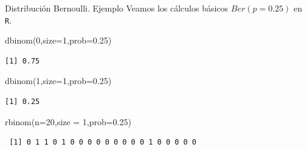 \documentclass[
  ignorenonframetext,
  aspectratio=169]{beamer}
\newenvironment{Shaded}{\begin{snugshade}}{\end{snugshade}}
\newcommand{\AttributeTok}[1]{\textcolor[rgb]{0.40,0.45,0.13}{#1}}
\newcommand{\DecValTok}[1]{\textcolor[rgb]{0.68,0.00,0.00}{#1}}
\newcommand{\FloatTok}[1]{\textcolor[rgb]{0.68,0.00,0.00}{#1}}
\newcommand{\FunctionTok}[1]{\textcolor[rgb]{0.28,0.35,0.67}{#1}}
\newcommand{\NormalTok}[1]{\textcolor[rgb]{0.00,0.23,0.31}{#1}}
\begin{document}
\begin{frame}[fragile]{Distribución Bernoulli. Ejemplo}
\protect\hypertarget{distribuciuxf3n-bernoulli.-ejemplo}{}
Veamos los cálculos básicos \(Ber(p=0.25)\) en \texttt{R}.

\begin{Shaded}
\begin{Highlighting}[]
\FunctionTok{dbinom}\NormalTok{(}\DecValTok{0}\NormalTok{,}\AttributeTok{size=}\DecValTok{1}\NormalTok{,}\AttributeTok{prob=}\FloatTok{0.25}\NormalTok{)}
\end{Highlighting}
\end{Shaded}

\begin{verbatim}
[1] 0.75
\end{verbatim}

\begin{Shaded}
\begin{Highlighting}[]
\FunctionTok{dbinom}\NormalTok{(}\DecValTok{1}\NormalTok{,}\AttributeTok{size=}\DecValTok{1}\NormalTok{,}\AttributeTok{prob=}\FloatTok{0.25}\NormalTok{)}
\end{Highlighting}
\end{Shaded}

\begin{verbatim}
[1] 0.25
\end{verbatim}

\begin{Shaded}
\begin{Highlighting}[]
\FunctionTok{rbinom}\NormalTok{(}\AttributeTok{n=}\DecValTok{20}\NormalTok{,}\AttributeTok{size =} \DecValTok{1}\NormalTok{,}\AttributeTok{prob=}\FloatTok{0.25}\NormalTok{)}
\end{Highlighting}
\end{Shaded}

\begin{verbatim}
 [1] 0 1 1 0 1 0 0 0 0 0 0 0 0 0 1 0 0 0 0 0
\end{verbatim}
\end{frame}
\end{document}

